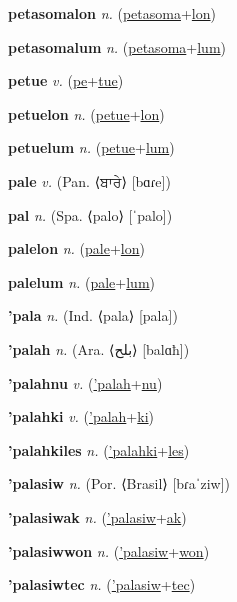 \textbf{\hypertarget{petasomalon}{petasomalon}} \textit{n.} (\hyperlink{petasoma}{petasoma}+\allowbreak \hyperlink{lon}{lon})


\textbf{\hypertarget{petasomalum}{petasomalum}} \textit{n.} (\hyperlink{petasoma}{petasoma}+\allowbreak \hyperlink{lum}{lum})


\textbf{\hypertarget{petue}{petue}} \textit{v.} (\hyperlink{pe}{pe}+\allowbreak \hyperlink{tue}{tue})


\textbf{\hypertarget{petuelon}{petuelon}} \textit{n.} (\hyperlink{petue}{petue}+\allowbreak \hyperlink{lon}{lon})


\textbf{\hypertarget{petuelum}{petuelum}} \textit{n.} (\hyperlink{petue}{petue}+\allowbreak \hyperlink{lum}{lum})


\textbf{\hypertarget{pale}{pale}} \textit{v.} (Pan. ⟨{\gurmukhi{}ਬਾਰੇ}⟩ [bɑɾe])


\textbf{\hypertarget{pal}{pal}} \textit{n.} (Spa. ⟨palo⟩ [ˈpalo])


\textbf{\hypertarget{palelon}{palelon}} \textit{n.} (\hyperlink{pale}{pale}+\allowbreak \hyperlink{lon}{lon})


\textbf{\hypertarget{palelum}{palelum}} \textit{n.} (\hyperlink{pale}{pale}+\allowbreak \hyperlink{lum}{lum})


\textbf{\hypertarget{'pala}{'pala}} \textit{n.} (Ind. ⟨pala⟩ [pala])


\textbf{\hypertarget{'palah}{'palah}} \textit{n.} (Ara. ⟨{\arabics{}بلح}⟩ [balɑħ])


\textbf{\hypertarget{'palahnu}{'palahnu}} \textit{v.} (\hyperlink{'palah}{'palah}+\allowbreak \hyperlink{nu}{nu})


\textbf{\hypertarget{'palahki}{'palahki}} \textit{v.} (\hyperlink{'palah}{'palah}+\allowbreak \hyperlink{ki}{ki})


\textbf{\hypertarget{'palahkiles}{'palahkiles}} \textit{n.} (\hyperlink{'palahki}{'palahki}+\allowbreak \hyperlink{les}{les})


\textbf{\hypertarget{'palasiw}{'palasiw}} \textit{n.} (Por. ⟨Brasil⟩ [bɾaˈziw])


\textbf{\hypertarget{'palasiwak}{'palasiwak}} \textit{n.} (\hyperlink{'palasiw}{'palasiw}+\allowbreak \hyperlink{ak}{ak})


\textbf{\hypertarget{'palasiwwon}{'palasiwwon}} \textit{n.} (\hyperlink{'palasiw}{'palasiw}+\allowbreak \hyperlink{won}{won})


\textbf{\hypertarget{'palasiwtec}{'palasiwtec}} \textit{n.} (\hyperlink{'palasiw}{'palasiw}+\allowbreak \hyperlink{tec}{tec})


